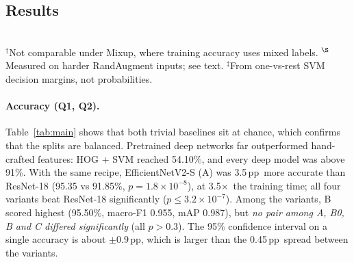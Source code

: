 \documentclass{COMPXXXX}
\newcommand{\pp}{\,pp}
\newcommand{\sx}{$\times$}
\begin{document}
\subsection{Results}
\begin{table}[t]
\centering\small
\caption{Test results on 2,000 CIFAR-10 images. $p$ is McNemar's test against A; mAP is one-vs-rest
classification mAP.}
\label{tab:main}
\\[1pt]
{\footnotesize $^\dagger$Not comparable under Mixup, where training accuracy uses mixed labels.
$^\S$Measured on harder RandAugment inputs; see text.
$^\ddagger$From one-vs-rest SVM decision margins, not probabilities.}
\end{table}

\paragraph{Accuracy (Q1, Q2).} Table~\ref{tab:main} shows that both trivial baselines sit at chance,
which confirms that the splits are balanced. Pretrained deep networks far outperformed hand-crafted
features: HOG + SVM reached 54.10\%, and every deep model was above 91\%. With the same recipe,
EfficientNetV2-S (A) was 3.5\pp\ more accurate than ResNet-18 (95.35 vs 91.85\%,
$p=1.8{\times}10^{-8}$), at 3.5\sx\ the training time; all four variants beat ResNet-18 significantly
($p\leq3.2{\times}10^{-7}$). Among the variants, B scored highest (95.50\%, macro-F1 0.955, mAP 0.987),
but \emph{no pair among A, B0, B and C differed significantly} (all $p>0.3$). The 95\% confidence
interval on a single accuracy is about $\pm0.9$\pp, which is larger than the 0.45\pp\ spread between
the variants.
\end{document}
